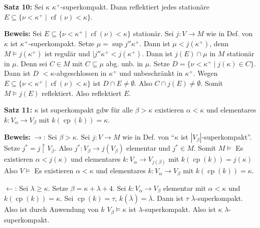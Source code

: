 \documentclass[a4paper,fontsize=11pt]{scrartcl}
\newcommand{\cf}{\operatorname{cf}}
\newcommand{\cp}{\operatorname{cp}}
\renewcommand{\bar}[1]{\overline{#1}}
\begin{document}
{\bf Satz 10:} Sei $\kappa$ $\kappa^+$-superkompakt.
	Dann reflektiert jedes stationäre $E\subseteq\{\nu<\kappa^+\mid \cf(\nu)<\kappa\}$.
	
	{\bf Beweis:} Sei $E\subseteq\{\nu<\kappa^+\mid \cf(\nu)<\kappa\}$ stationär.
		Sei  $j\colon V\to M$ wie in Def. von $\kappa$ ist $\kappa^+$-superkompakt.
		Setze $\mu=\sup j''\kappa^+$.
		Dann ist $\mu<j(\kappa^+)$, denn $M\models j(\kappa^+)$ ist regulär und $|j''\kappa^+<j(\kappa^+)$.
		Dann ist $j(E)\cap\mu$ in $M$ stationär in $\mu$.
		Denn sei $C\in M$ mit $C\subseteq\mu$ abg. unb. in $\mu$.
		Setze $D=\{\nu<\kappa^+\mid j(\kappa)\in C\}$.
		Dann ist $D$ $<\kappa$-abgeschlossen in $\kappa^+$ und unbeschränkt in $\kappa^+$.
		Wegen $E\subseteq\{\nu<\kappa^+\mid \cf(\nu)<\kappa\}$ ist $D\cap E\neq\emptyset$.
		Also $C\cap j(E)\neq\emptyset$.
		Somit $M\models j(E)$ reflektiert. Also reflektiert $E$.
		

{\bf Satz 11:} $\kappa$ ist superkompakt gdw für alle $\beta>\kappa$ existieren $\alpha<\kappa$ und elementares $k\colon V_\alpha\to V_\beta$ mit $k(\cp(k))=\kappa$.

	{\bf Beweis:} $\to$: Sei $\beta>\kappa$. Sei $j\colon V\to M$ wie in Def. von ``$\kappa$ ist $|V_\beta|$-superkompakt''.
		Setze $j^*=j\upharpoonright V_\beta$.
		Also $j^*\colon V_\beta\to j(V_\beta)$ elementar und $j^*\in M$.
		Somit $M\models$ Es existieren $\alpha<j(\kappa)$ und elementares $k\colon V_\alpha\to V_{j(\beta)}$ mit $k(\cp(k))=j(\kappa)$\newline
		 Also $V\models$ Es existieren $\alpha<\kappa$ und elementares $k\colon V_\alpha\to V_\beta$ mit $k(\cp(k))=\kappa$.

		$\leftarrow$: Sei $\lambda\ge\kappa$. Setze $\beta=\kappa+\lambda+4$.
		Sei $k\colon V_\alpha\to V_\beta$ elementar mit $\alpha<\kappa$ und $k(\cp(k))=\kappa$.
		Sei $\cp(k)=\tau$, $k(\bar\lambda)=\bar\lambda$.
		Dann ist $\tau$ $\bar\lambda$-superkompakt.
		Also ist durch Anwendung von $k$ $V_\beta\models \kappa$ ist $\lambda$-superkompakt.
		Also ist $\kappa$ $\lambda$-superkompakt.
\end{document}
